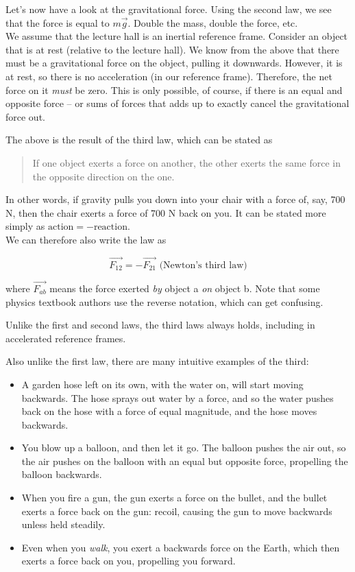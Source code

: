 Let's now have a look at the gravitational force. Using the second law, we see that the force is equal to $m \vec{g}$. Double the mass, double the force, etc.\\
We assume that the lecture hall is an inertial reference frame. Consider an object that is at rest (relative to the lecture hall). We know from the above that there must be a gravitational force on the object, pulling it downwards. However, it is at rest, so there is no acceleration (in our reference frame). Therefore, the net force on it \emph{must} be zero. This is only possible, of course, if there is an equal and opposite force -- or sums of forces that adds up to exactly cancel the gravitational force out.

The above is the result of the third law, which can be stated as

\begin{quote}
If one object exerts a force on another, the other exerts the same force in the opposite direction on the one.
\end{quote}

In other words, if gravity pulls you down into your chair with a force of, say, 700 N, then the chair exerts a force of 700 N back on you. It can be stated more simply as $\text{action} = -\text{reaction}$.\\
We can therefore also write the law as

\begin{equation}
\vec{F_{12}} = -\vec{F_{21}} \text{ (Newton's third law)} \label{eq:newton3}
\end{equation}

where $\vec{F_{ab}}$ means the force exerted \emph{by} object a \emph{on} object b. Note that some physics textbook authors use the reverse notation, which can get confusing.

Unlike the first and second laws, the third laws always holds, including in accelerated reference frames.

Also unlike the first law, there are many intuitive examples of the third:

\begin{itemize}
\item A garden hose left on its own, with the water on, will start moving backwards. The hose sprays out water by a force, and so the water pushes back on the hose with a force of equal magnitude, and the hose moves backwards.
\item You blow up a balloon, and then let it go. The balloon pushes the air out, so the air pushes on the balloon with an equal but opposite force, propelling the balloon backwards.
\item When you fire a gun, the gun exerts a force on the bullet, and the bullet exerts a force back on the gun: recoil, causing the gun to move backwards unless held steadily.
\item Even when you \emph{walk}, you exert a backwards force on the Earth, which then exerts a force back on you, propelling you forward.
\end{itemize}

